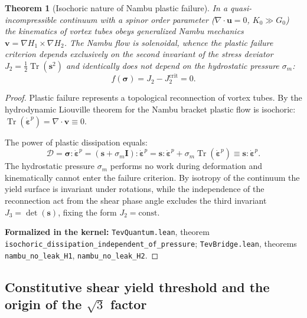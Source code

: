 \documentclass[11pt,a4paper]{article}
\newtheorem{theorem}{Theorem}
\theoremstyle{definition}
\theoremstyle{remark}
\begin{document}
\begin{theorem}[Isochoric nature of Nambu plastic failure]
\label{thm:isochoric_mises_form}
In a quasi-incompressible continuum with a spinor order parameter ($\nabla \cdot \mathbf{u} = 0$, $K_0 \gg G_0$) the kinematics of vortex tubes obeys generalized Nambu mechanics $\mathbf{v} = \nabla H_1 \times \nabla H_2$. The Nambu flow is solenoidal, whence the plastic failure criterion depends exclusively on the second invariant of the stress deviator $J_2 = \frac{1}{2}\operatorname{Tr}(\mathbf{s}^2)$ and identically does not depend on the hydrostatic pressure $\sigma_m$:
\begin{equation}
f(\boldsymbol{\sigma}) = J_2 - J_2^{\mathrm{crit}} = 0.
\label{eq:mises_isochoric_form}
\end{equation}
\end{theorem}
\begin{proof}
Plastic failure represents a topological reconnection of vortex tubes. By the hydrodynamic Liouville theorem for the Nambu bracket plastic flow is isochoric: $\operatorname{Tr}(\dot{\boldsymbol{\varepsilon}}^p) = \nabla \cdot \mathbf{v} \equiv 0$. 

The power of plastic dissipation equals:
\begin{equation}
\mathcal{D} = \boldsymbol{\sigma} : \dot{\boldsymbol{\varepsilon}}^p = (\mathbf{s} + \sigma_m \mathbf{I}) : \dot{\boldsymbol{\varepsilon}}^p = \mathbf{s} : \dot{\boldsymbol{\varepsilon}}^p + \sigma_m \operatorname{Tr}(\dot{\boldsymbol{\varepsilon}}^p) \equiv \mathbf{s} : \dot{\boldsymbol{\varepsilon}}^p.
\end{equation}
The hydrostatic pressure $\sigma_m$ performs no work during deformation and kinematically cannot enter the failure criterion. By isotropy of the continuum the yield surface is invariant under rotations, while the independence of the reconnection act from the shear phase angle excludes the third invariant $J_3 = \det(\mathbf{s})$, fixing the form $J_2 = \text{const}$.

\noindent\small\textbf{Formalized in the kernel:} \texttt{TevQuantum.lean}, theorem \texttt{isochoric_dissipation_independent_of_pressure}; \texttt{TevBridge.lean}, theorems \texttt{nambu_no_leak_H1}, \texttt{nambu_no_leak_H2}.
\end{proof}

\subsection{Constitutive shear yield threshold and the origin of the $\sqrt{3}$ factor}
\end{document}

